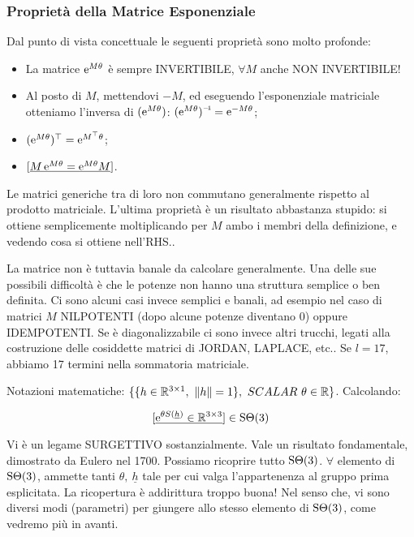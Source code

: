 \subsubsection{Proprietà della Matrice Esponenziale}

Dal punto di vista concettuale le seguenti proprietà sono molto profonde:

\begin{itemize}

\item La matrice $\mathop{}\!\mathrm{e}^{M\theta}$ è sempre INVERTIBILE, $\forall M$ anche NON INVERTIBILE!
\item Al posto di $M$, mettendovi $-M$, ed eseguendo l'esponenziale matriciale otteniamo l'inversa di $(\mathop{}\!\mathrm{e}^{M\theta})$:
$\inv{(\e^{M\theta})} = \e^{-M\theta}$;
\item $(\mathop{}\!\mathrm{e}^{M\theta})^\top = \mathop{}\!\mathrm{e}^{M^\top\theta}$;
\item $[\underline{M\mathop{}\!\mathrm{e}^{M\theta} = \mathop{}\!\mathrm{e}^{M\theta}M}]$.

\end{itemize}

Le matrici generiche tra di loro non commutano generalmente rispetto al prodotto matriciale. L'ultima proprietà è un risultato abbastanza stupido: si ottiene semplicemente moltiplicando per $M$ ambo i membri della definizione, e vedendo cosa si ottiene nell'RHS..

La matrice non è tuttavia banale da calcolare generalmente. Una delle sue possibili difficoltà è che le potenze non hanno una struttura semplice o ben definita. Ci sono alcuni casi invece semplici e banali, ad esempio nel caso di matrici $M$ NILPOTENTI (dopo alcune potenze diventano 0) oppure IDEMPOTENTI. Se è diagonalizzabile ci sono invece altri trucchi, legati alla costruzione delle cosiddette matrici di JORDAN, LAPLACE, etc.. Se $l=17$, abbiamo 17 termini nella sommatoria matriciale.

Notazioni matematiche: $\{\{h\in\mathbb{R}^{3\times 1},\ \lVert h\rVert=1\},\ SCALAR\ \theta\in\mathbb{R}\}$. Calcolando:

\[
	[\underline{\mathop{}\!\mathrm{e}^{\theta S(\underline{h})} \in\mathbb{R}^{3\times 3}}] \in\operatorname{S\Theta}(3)
\]

Vi è un legame SURGETTIVO sostanzialmente. Vale un risultato fondamentale, dimostrato da Eulero nel 1700. Possiamo ricoprire tutto $\operatorname{S\Theta}(3)$. $\forall$ elemento di $\operatorname{S\Theta}(3)$, ammette tanti $\theta,\ \underline{h}$ tale per cui valga l'appartenenza al gruppo prima esplicitata. La ricopertura è addirittura troppo buona! Nel senso che, vi sono diversi modi (parametri) per giungere allo stesso elemento di $\operatorname{S\Theta}(3)$, come vedremo più in avanti.

